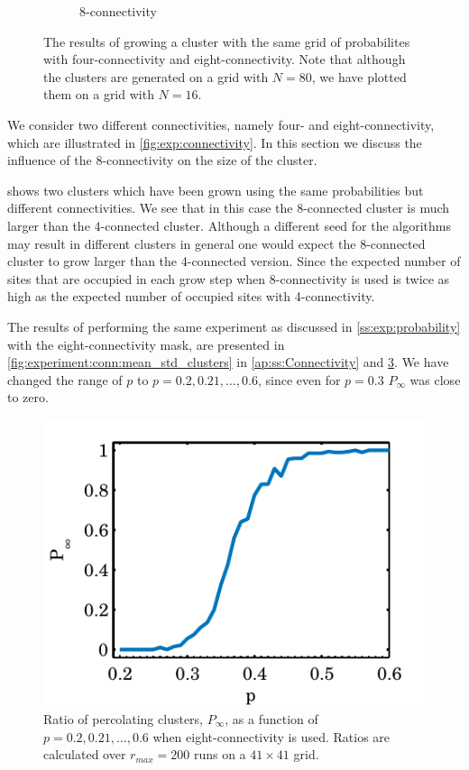 \begin{figure}
\begin{subfigure}{0.45\columnwidth}
		\caption{8-connectivity}
		\label{fig:exp:connectivity:eightConnect}
	\end{subfigure}	
	\caption{The results of growing a cluster with the same grid of probabilites with  four-connectivity and  eight-connectivity. Note that although the clusters are generated on a grid with $N = 80$, we have plotted them on a grid with $N = 16$.}
	\label{fig:exp:connectivityResults}
\end{figure}

We consider two different connectivities, namely four- and eight-connectivity, which are illustrated in \cref{fig:exp:connectivity}. In this section we discuss the influence of the 8-connectivity on the size of the cluster.

 shows two clusters which have been grown using the same probabilities but different connectivities. We see that in this case the 8-connected cluster is much larger than the 4-connected cluster. Although a different seed for the algorithms may result in different clusters in general one would expect the 8-connected cluster to grow larger than the 4-connected version. Since the expected number of sites that are occupied in each grow step when 8-connectivity is used is twice as high as the expected number of occupied sites with 4-connectivity. 

The results of performing the same experiment as discussed in \cref{ss:exp:probability} with the eight-connectivity mask, are presented in \cref{fig:experiment:conn:mean_std_clusters} in \cref{ap:ss:Connectivity} and \cref{fig:experiment:conn:p_inf_ratio}. We have changed the range of $p$ to $p = 0.2, 0.21, \dotsc, 0.6$, since even for $p = 0.3$ $P_\infty$ was close to zero. 

\begin{figure}%
	\centering
	\includegraphics[width=\columnwidth]{./img/assignment_d_p_infinite_ratio_p.pdf}
	\caption{Ratio of percolating clusters, $P_\infty$, as a function of $p = 0.2, 0.21, \dotsc, 0.6$ when eight-connectivity is used. Ratios are calculated over $r_{max} = 200$ runs on a $41 \times 41$ grid.}
	\label{fig:experiment:conn:p_inf_ratio}
\end{figure}

